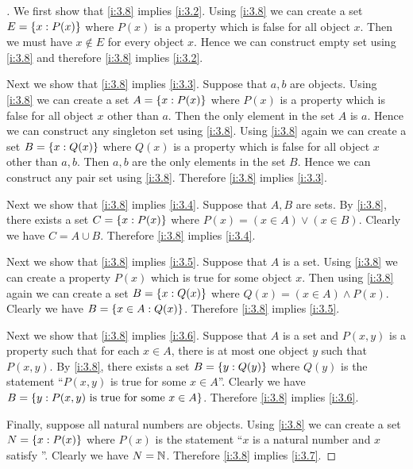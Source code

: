 \begin{proof}[]
  We first show that \cref{i:3.8} implies \cref{i:3.2}.
  Using \cref{i:3.8} we can create a set \(E = \left\lbrace x : P(x)\right\rbrace\) where \(P(x)\) is a property which is false for all object \(x\).
  Then we must have \(x \notin E\) for every object \(x\).
  Hence we can construct empty set using \cref{i:3.8} and therefore \cref{i:3.8} implies \cref{i:3.2}.

  Next we show that \cref{i:3.8} implies \cref{i:3.3}.
  Suppose that \(a, b\) are objects.
  Using \cref{i:3.8} we can create a set \(A = \left\lbrace x : P(x)\right\rbrace\) where \(P(x)\) is a property which is false for all object \(x\) other than \(a\).
  Then the only element in the set \(A\) is \(a\).
  Hence we can construct any singleton set using \cref{i:3.8}.
  Using \cref{i:3.8} again we can create a set \(B = \left\lbrace x : Q(x)\right\rbrace\) where \(Q(x)\) is a property which is false for all object \(x\) other than \(a, b\).
  Then \(a, b\) are the only elements in the set \(B\).
  Hence we can construct any pair set using \cref{i:3.8}.
  Therefore \cref{i:3.8} implies \cref{i:3.3}.

  Next we show that \cref{i:3.8} implies \cref{i:3.4}.
  Suppose that \(A, B\) are sets.
  By \cref{i:3.8}, there exists a set \(C = \left\lbrace x : P(x)\right\rbrace\) where \(P(x) = (x \in A) \lor (x \in B)\).
  Clearly we have \(C = A \cup B\).
  Therefore \cref{i:3.8} implies \cref{i:3.4}.

  Next we show that \cref{i:3.8} implies \cref{i:3.5}.
  Suppose that \(A\) is a set.
  Using \cref{i:3.8} we can create a property \(P(x)\) which is true for some object \(x\).
  Then using \cref{i:3.8} again we can create a set \(B = \left\lbrace x : Q(x)\right\rbrace\) where \(Q(x) = (x \in A) \land P(x)\).
  Clearly we have \(B = \left\lbrace x \in A : Q(x)\right\rbrace\).
  Therefore \cref{i:3.8} implies \cref{i:3.5}.

  Next we show that \cref{i:3.8} implies \cref{i:3.6}.
  Suppose that \(A\) is a set and \(P(x, y)\) is a property such that for each \(x \in A\), there is at most one object \(y\) such that \(P(x, y)\).
  By \cref{i:3.8}, there exists a set \(B = \left\lbrace y : Q(y)\right\rbrace\) where \(Q(y)\) is the statement ``\(P(x, y)\) is true for some \(x \in A\)''.
  Clearly we have \(B = \left\lbrace y : P(x, y) \text{ is true for some } x \in A\right\rbrace\).
  Therefore \cref{i:3.8} implies \cref{i:3.6}.

  Finally, suppose all natural numbers are objects.
  Using \cref{i:3.8} we can create a set \(N = \left\lbrace x : P(x)\right\rbrace\) where \(P(x)\) is the statement ``\(x\) is a natural number and \(x\) satisfy ''.
  Clearly we have \(N = \mathbb{N}\).
  Therefore \cref{i:3.8} implies \cref{i:3.7}.
\end{proof}

